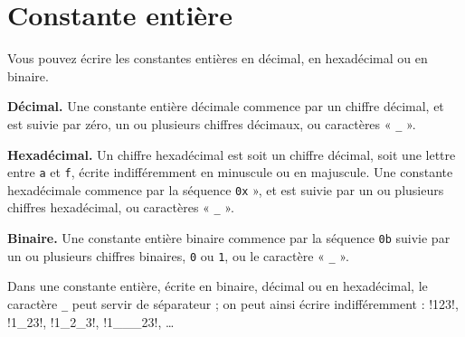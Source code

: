 %
%
%



\section{Constante entière}

Vous pouvez écrire les constantes entières en décimal, en hexadécimal ou en binaire. 

\textbf{Décimal.} Une constante entière décimale commence par un chiffre décimal, et est suivie par zéro, un ou plusieurs chiffres décimaux, ou caractères « \texttt{\_} ».

\textbf{Hexadécimal.} Un chiffre hexadécimal est soit un chiffre décimal, soit une lettre entre \texttt{a} et \texttt{f}, écrite indifféremment en minuscule ou en majuscule. Une constante hexadécimale commence par la séquence \texttt{0x} », et est suivie par un ou plusieurs chiffres hexadécimal, ou caractères « \texttt{\_} ».

\textbf{Binaire.} Une constante entière binaire commence par la séquence \texttt{0b} suivie par un ou plusieurs chiffres binaires, \texttt{0} ou \texttt{1}, ou le caractère « \texttt{\_} ».

Dans une constante entière, écrite en binaire, décimal ou en hexadécimal, le caractère \texttt{\_} peut servir de séparateur ; on peut ainsi écrire indifféremment : \plm!123!, \plm!1_23!, \plm!1_2_3!, \plm!1___23!, \dots

